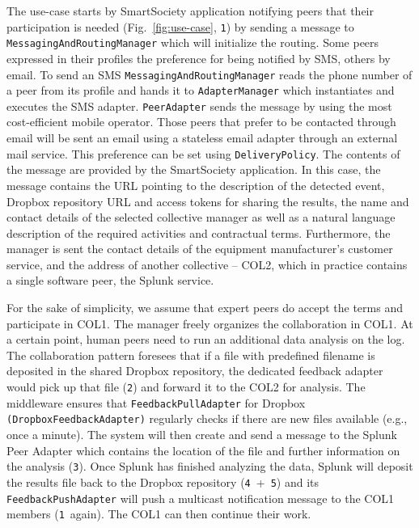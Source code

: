 \documentclass{llncs}
\begin{document}
	The use-case starts by SmartSociety application notifying peers that their participation is needed (Fig.~\ref{fig:use-case}, \texttt{1}\degree) by sending a message to \texttt{MessagingAndRoutingManager} which will initialize the routing. Some peers expressed in their profiles the preference for being notified by SMS, others by email. To send an SMS \texttt{MessagingAndRoutingManager} reads the phone number of a peer from its profile and hands it to \texttt{AdapterManager} which instantiates and executes the SMS adapter. \texttt{PeerAdapter} sends the message by using the most cost-efficient mobile operator. Those peers that prefer to be contacted through email will be sent an email using a stateless email adapter through an external mail service. This preference can be set using \texttt{DeliveryPolicy}.
	The contents of the message are provided by the SmartSociety application. In this case, the message contains the URL pointing to the description of the detected event, Dropbox repository URL and access tokens for sharing the results, the name and contact details of the selected collective manager as well as a natural language description of the required activities and contractual terms. Furthermore, the manager is sent the contact details of the equipment manufacturer's customer service, and the address of another collective -- COL2, which in practice contains a single software peer, the Splunk service.

	For the sake of simplicity, we assume that expert peers do accept the terms and participate in COL1. The manager freely organizes the collaboration in COL1. At a certain point, human peers need to run an additional data analysis on the log. The collaboration pattern foresees that if a file with predefined filename is deposited in the shared Dropbox repository, the dedicated feedback adapter would pick up that file (\texttt{2}\degree) and forward it to the COL2 for analysis. The middleware ensures that \texttt{FeedbackPullAdapter} for Dropbox \texttt{(DropboxFeedbackAdapter)} regularly checks if there are new files available (e.g., once a minute).
	The system will then create and send a message to the Splunk Peer Adapter which contains the location of the file and further information on the analysis (\texttt{3}\degree). Once Splunk has finished analyzing the data, Splunk will deposit the results file back to the Dropbox repository (\texttt{4}\degree~+~\texttt{5}\degree) and its \texttt{FeedbackPushAdapter} will push a multicast notification message to the COL1 members (\texttt{1}\degree~again). The COL1 can then continue their work.
\end{document}
